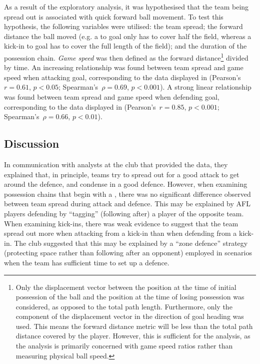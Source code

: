 
As a result of the exploratory analysis, it was hypothesised that the team being spread out is associated with quick forward ball movement. To test this hypothesis, the following variables were utilised: the team spread; the forward distance the ball moved (e.g. a \centrebounce{} to goal only has to cover half the field, whereas a kick-in to goal has to cover the full length of the field); and the duration of the possession chain. \textit{Game speed} was then defined as the forward distance\footnote{Only the displacement vector between the position at the time of initial possession of the ball and the position at the time of losing possession was considered, as opposed to the total path length. Furthermore, only the component of the displacement vector in the direction of goal heading was used. This means the forward distance metric will be less than the total path distance covered by the player. However, this is sufficient for the analysis, as the analysis is primarily concerned with game speed ratios rather than measuring physical ball speed.} divided by time. An increasing relationship was found between team spread and game speed when attacking goal, corresponding to the data displayed in  (Pearson's~$r = 0.61$, $p < 0.05$; Spearman's~$\rho = 0.69$, $p < 0.001$). A strong linear relationship was found between team spread and game speed when defending goal, corresponding to the data displayed in  (Pearson's~$r = 0.85$, $p < 0.001$; Spearman's~$\rho = 0.66$, $p < 0.01$).

\subsection{Discussion}

In communication with analysts at the club that provided the data, they explained that, in principle, teams try to spread out for a good attack to get around the defence, and condense in a good defence. However, when examining possession chains that begin with a \centrebounce{}, there was no significant difference observed between team spread during attack and defence. This may be explained by AFL players defending by ``tagging'' (following after) a player of the opposite team. When examining kick-ins, there was weak evidence to suggest that the team spread out more when attacking from a kick-in than when defending from a kick-in. The club suggested that this may be explained by a ``zone defence'' strategy (protecting space rather than following after an opponent) employed in scenarios when the team has sufficient time to set up a defence.

